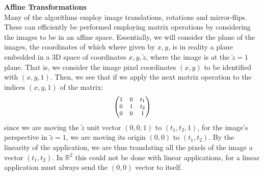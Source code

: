 \documentclass[11pt, a4paper, twoside]{article} %
\newcommand{\R}{\mathbb{R}} %
\DeclareRobustCommand{\mybox}[2][gray!10]{%
\begin{tcolorbox}[   %
        left=0.2cm,
        right=0.2cm,
        top=0.15cm,
        bottom=0.15cm,
        colback=#1,
        colframe=#1,
        width=\dimexpr\textwidth\relax, 
        enlarge left by=0mm,
        boxsep=5pt,
        arc=0pt,outer arc=0pt,
        ]
        #2
\end{tcolorbox}
}
\begin{document}
\mybox{{\bf Affine Transformations \vspace{0.2cm} \\}
Many of the algorithms employ image translations, rotations and mirror-flips. These can efficiently be performed employing matrix operations by considering the images to be in an affine space. Essentially, we will consider the plane of the images, the coordinates of which where given by $x,y$, is in reality a plane embedded in a 3D space of coordinates $x,y,\tilde{z}$, where the image is at the $\tilde{z}=1$ plane. That is, we consider the image pixel coordinates $(x,y)$ to be identified with $(x,y,1)$. Then, we see that if we apply the next matrix operation to the indices $(x,y,1)$ of the matrix:
\begin{equation}
\footnotesize
\begin{pmatrix}
1 & 0 & t_1\\
0 & 1 & t_2 \\
0 & 0 & 1
\end{pmatrix}
\end{equation}
since we are moving the $\tilde{z}$ unit vector $(0,0,1)$ to $(t_1,t_2,1)$, for the image's perspective in $\tilde{z}=1$, we are moving its origin $(0,0)$ to $(t_1,t_2)$. By the linearity of the application, we are thus translating all the pixels of the image a vector $(t_1,t_2)$. In $\R^2$ this could not be done with linear applications, for a linear application must always send the $(0,0)$ vector to itself.\\

}
\end{document}
